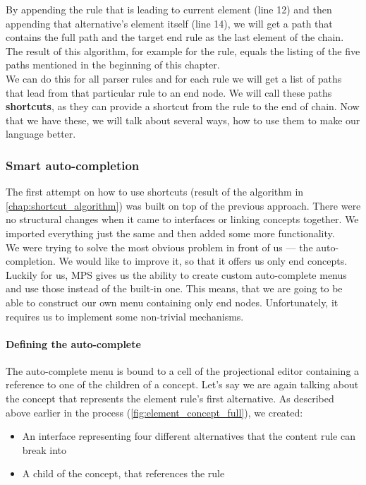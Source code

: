By appending the rule that is leading to current element (line 12) and then appending that alternative's element itself (line 14), we will get a path that contains the full path and the target end rule as the last element of the chain.
The result of this algorithm, for example for the  rule, equals the listing of the five paths mentioned in the beginning of this chapter.
\\

We can do this for all parser rules and for each rule we will get a list of paths that lead from that particular rule to an end node.
We will call these paths \textbf{shortcuts}, as they can provide a shortcut from the rule to the end of chain.
Now that we have these, we will talk about several ways, how to use them to make our language better.

\subsubsection{Smart auto-completion}
The first attempt on how to use shortcuts (result of the algorithm in \ref{chap:shortcut_algorithm}) was built on top of the previous approach.
There were no structural changes when it came to interfaces or linking concepts together.
We imported everything just the same and then added some more functionality.
\\

We were trying to solve the most obvious problem in front of us --- the auto-completion.
We would like to improve it, so that it offers us only end concepts.
Luckily for us, MPS gives us the ability to create custom auto-complete menus and use those instead of the built-in one.
This means, that we are going to be able to construct our own menu containing only end nodes.
Unfortunately, it requires us to implement some non-trivial mechanisms.

\paragraph{Defining the auto-complete}

The auto-complete menu is bound to a cell of the projectional editor containing a reference to one of the children of a concept.
Let's say we are again talking about the concept that represents the element rule's first alternative.
As described above earlier in the process (\ref{fig:element_concept_full}), we created:

\begin{itemize}
	\item An interface  representing four different alternatives that the content rule can break into

	\item A child of the  concept, that references the  rule
\end{itemize}

